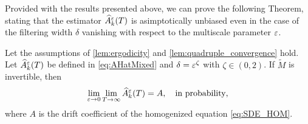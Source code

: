 \documentclass[review,onefignum,onetabnum]{siamonline190516}
\begin{document}
Provided with the results presented above, we can prove the following Theorem, stating that the estimator $\widehat A^\varepsilon_k(T)$ is asimptotically unbiased even in the case of the filtering width $\delta$ vanishing with respect to the multiscale parameter $\varepsilon$.

\begin{theorem}\label{thm:mainTheorem_zeta} Let the assumptions of \cref{lem:ergodicity} and \cref{lem:quadruple_convergence} hold. Let $\widehat A^\varepsilon_k(T)$ be defined in \eqref{eq:AHatMixed} and $\delta = \varepsilon^\zeta$ with $\zeta \in (0,2)$. If $\widetilde M$ is invertible, then
		\begin{equation}
		\lim_{\varepsilon \to 0} \lim_{T \to \infty} \widehat A_k^\varepsilon(T) = A, \quad \text{in probability},
		\end{equation}
		where $A$ is the drift coefficient of the homogenized equation \eqref{eq:SDE_HOM}.
\end{theorem}
\end{document}
